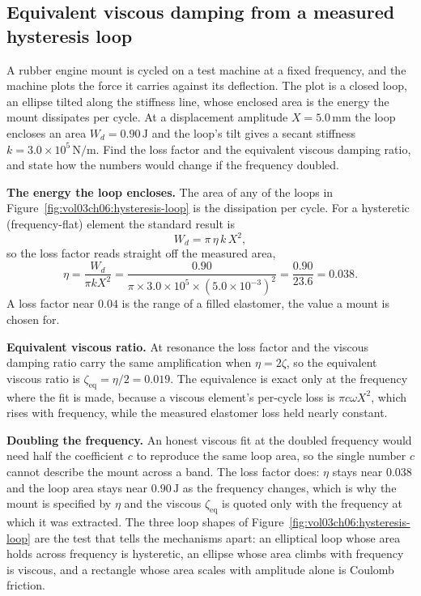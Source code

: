 \subsection{Equivalent viscous damping from a measured hysteresis loop}

A rubber engine mount is cycled on a test machine at a fixed frequency,
and the machine plots the force it carries against its deflection. The
plot is a closed loop, an ellipse tilted along the stiffness line, whose
enclosed area is the energy the mount dissipates per cycle. At a
displacement amplitude $X = 5.0\,\si{\milli\meter}$ the loop encloses an
area $W_d = 0.90\,\text{J}$ and the loop's tilt gives a secant stiffness
$k = 3.0\times 10^5\,\si{\newton\per\meter}$. Find the loss factor and
the equivalent viscous damping ratio, and state how the numbers would
change if the frequency doubled.

\textbf{The energy the loop encloses.} The area of any of the loops in
Figure~\ref{fig:vol03ch06:hysteresis-loop} is the dissipation per cycle.
For a hysteretic (frequency-flat) element the standard result is
\[
W_d = \pi\,\eta\,k\,X^2,
\]
so the loss factor reads straight off the measured area,
\[
\eta = \frac{W_d}{\pi k X^2} = \frac{0.90}{\pi\times 3.0\times 10^5\times
(5.0\times 10^{-3})^2} = \frac{0.90}{23.6} = 0.038.
\]
A loss factor near $0.04$ is the range of a filled elastomer, the value
a mount is chosen for.

\textbf{Equivalent viscous ratio.} At resonance the loss factor and the
viscous damping ratio carry the same amplification when $\eta = 2\zeta$,
so the equivalent viscous ratio is $\zeta_{\text{eq}} = \eta/2 = 0.019$.
The equivalence is exact only at the frequency where the fit is made,
because a viscous element's per-cycle loss is $\pi c\omega X^2$, which
rises with frequency, while the measured elastomer loss held nearly
constant.

\textbf{Doubling the frequency.} An honest viscous fit at the doubled
frequency would need half the coefficient $c$ to reproduce the same
loop area, so the single number $c$ cannot describe the mount across a
band. The loss factor does: $\eta$ stays near $0.038$ and the loop area
stays near $0.90\,\text{J}$ as the frequency changes, which is why the
mount is specified by $\eta$ and the viscous $\zeta_{\text{eq}}$ is
quoted only with the frequency at which it was extracted. The three loop
shapes of Figure~\ref{fig:vol03ch06:hysteresis-loop} are the test that
tells the mechanisms apart: an elliptical loop whose area holds across
frequency is hysteretic, an ellipse whose area climbs with frequency is
viscous, and a rectangle whose area scales with amplitude alone is
Coulomb friction.

